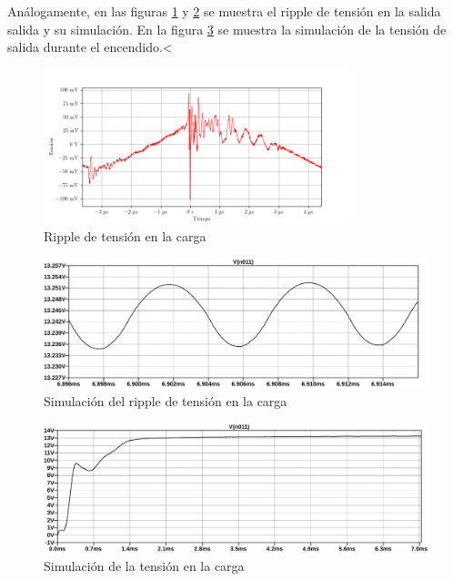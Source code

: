 Análogamente, en las figuras \ref{fig:osc:58} y \ref{fig:sim:21ripple} se muestra el ripple de tensión en la salida salida y su simulación. En la figura \ref{fig:sim:21} se muestra la simulación de la tensión de salida durante el encendido.<

\begin{figure}[H]
    \centering
    \includegraphics[width=0.8\textwidth]{images/capturas-osciloscopio/17-11-2022/58.png}
    \caption{Ripple de tensión en la carga}
    \label{fig:osc:58}
\end{figure}

\begin{figure}[H]
    \centering
    \includegraphics[width=\textwidth]{images/sim/21-ripple.pdf}
    \caption{Simulación del ripple de tensión en la carga}
    \label{fig:sim:21ripple}
\end{figure}

\begin{figure}[H]
    \centering
    \includegraphics[width=\textwidth]{images/sim/21.pdf}
    \caption{Simulación de la tensión en la carga}
    \label{fig:sim:21}
\end{figure}

